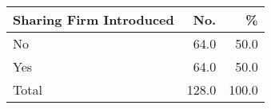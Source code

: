 \documentclass{article}
\begin{document}
\begin{tabular}{lrr}
\hline
Sharing Firm Introduced&No.&\% \\
\hline
No&64.0&50.0 \\
Yes&64.0&50.0 \\
Total&128.0&100.0 \\
\hline
\end{tabular}
\end{document}
